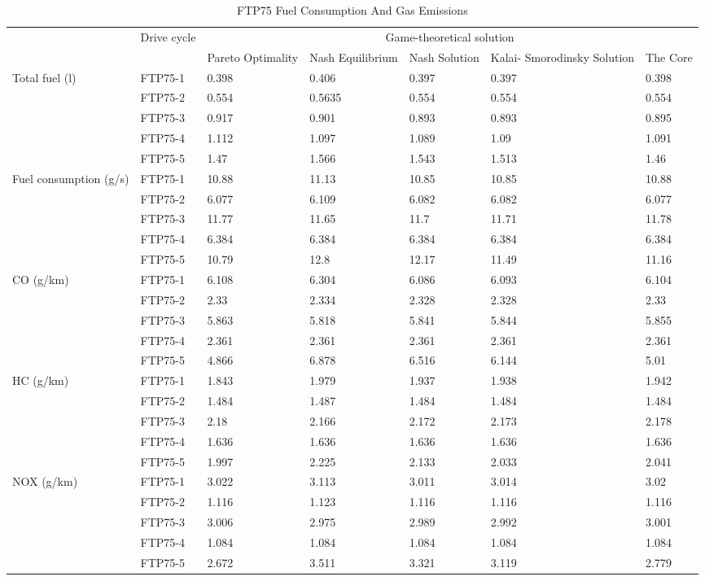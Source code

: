 \begin{table}[h]
\centering
\begin{tabular}{ |p{1.5cm}|p{1.5cm}|p{1.3cm}|p{1.3cm}|p{1.3cm}|p{1.3cm}|p{1.3cm}|} 
 \hline
  \cline{3-7}
   & Drive cycle & \multicolumn{5}{|c|}{Game-theoretical solution} \\
   \cline{3-7}
   & & Pareto Optimality & Nash Equilibrium & Nash Solution & Kalai- Smorodinsky Solution & The Core \\
 \hline\hline
 \multirow{5}{*}{\parbox{1.5cm}{Total fuel (l)}} 
 & FTP75-1 & 0.398 & 0.406 & 0.397 & 0.397 & 0.398 \\ 
 & FTP75-2 & 0.554 & 0.5635 & 0.554 & 0.554 & 0.554 \\  
 & FTP75-3 & 0.917 & 0.901 & 0.893 & 0.893 & 0.895 \\ 
 & FTP75-4 & 1.112 & 1.097 & 1.089 & 1.09 & 1.091 \\ 
 & FTP75-5 & 1.47 & 1.566 & 1.543 & 1.513 & 1.46 \\ 
 \hline 
 \multirow{5}{*}{\parbox{1.5cm}{Fuel consumption (g/s)}} 
 & FTP75-1 & 10.88 & 11.13 & 10.85 & 10.85 & 10.88 \\ 
 & FTP75-2 & 6.077 & 6.109 & 6.082 & 6.082 & 6.077 \\ 
 & FTP75-3 & 11.77 & 11.65 & 11.7 & 11.71 & 11.78 \\ 
 & FTP75-4 & 6.384 & 6.384 & 6.384 & 6.384 & 6.384 \\ 
 & FTP75-5 & 10.79 & 12.8 & 12.17 & 11.49 & 11.16 \\ 
 \hline
 \multirow{5}{*}{\parbox{1.5cm}{CO (g/km)}} 
 & FTP75-1 & 6.108 & 6.304 & 6.086 & 6.093 & 6.104 \\ 
 & FTP75-2 & 2.33 & 2.334 & 2.328 & 2.328 & 2.33 \\ 
 & FTP75-3 & 5.863 & 5.818 & 5.841 & 5.844 & 5.855 \\ 
 & FTP75-4 & 2.361 & 2.361 & 2.361 & 2.361 & 2.361 \\ 
 & FTP75-5 & 4.866 & 6.878 & 6.516 & 6.144 & 5.01 \\  
 \hline 
 \multirow{5}{*}{\parbox{1.5cm}{HC (g/km)}} 
 & FTP75-1 & 1.843 & 1.979 & 1.937 & 1.938 & 1.942 \\ 
 & FTP75-2 & 1.484 & 1.487 & 1.484 & 1.484 & 1.484 \\  
 & FTP75-3 & 2.18 & 2.166 & 2.172 & 2.173 & 2.178 \\ 
 & FTP75-4 & 1.636 & 1.636 & 1.636 & 1.636 & 1.636 \\ 
 & FTP75-5 & 1.997 & 2.225 & 2.133 & 2.033 & 2.041 \\  
 \hline
 \multirow{5}{*}{\parbox{1.5cm}{NOX (g/km)}} 
 & FTP75-1 & 3.022 & 3.113 & 3.011 & 3.014 & 3.02 \\
 & FTP75-2 & 1.116 & 1.123 & 1.116 & 1.116 & 1.116 \\ 
 & FTP75-3 & 3.006 & 2.975 & 2.989 & 2.992 & 3.001 \\ 
 & FTP75-4 & 1.084 & 1.084 & 1.084 & 1.084 & 1.084 \\ 
 & FTP75-5 & 2.672 & 3.511 & 3.321 & 3.119 & 2.779 \\ 
 \hline  
\end{tabular}
\caption{FTP75 Fuel Consumption And Gas Emissions}
\label{tab:fuelEmis}
\end{table}

